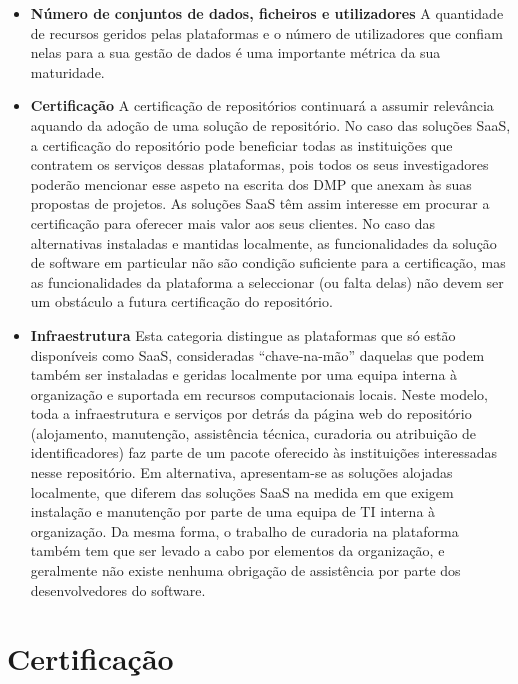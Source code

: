 \documentclass[sigconf,nonacm]{acmart}
\begin{document}
\begin{itemize}
	\item \textbf{Número de conjuntos de dados, ficheiros e utilizadores}
	A quantidade de recursos geridos pelas plataformas e o número de utilizadores que confiam nelas para a sua gestão de dados é uma importante métrica da sua maturidade. 
	\item \textbf{Certificação}
	A certificação de repositórios continuará a assumir relevância aquando da adoção de uma solução de repositório. No caso das soluções \gls{SaaS}, a certificação do repositório pode beneficiar todas as instituições que contratem os serviços dessas plataformas, pois todos os seus investigadores poderão mencionar esse aspeto na escrita dos \gls{DMP} que anexam às suas propostas de projetos. As soluções \gls{SaaS} têm assim interesse em procurar a certificação para oferecer mais valor aos seus clientes. No caso das alternativas instaladas e mantidas localmente, as funcionalidades da solução de software em particular não são condição suficiente para a certificação, mas as funcionalidades da plataforma a seleccionar (ou falta delas) não devem ser um obstáculo a futura certificação do repositório.
	\item \textbf{Infraestrutura}
	Esta categoria distingue as plataformas que só estão disponíveis como \gls{SaaS}, consideradas ``chave-na-mão'' daquelas que podem também ser instaladas e geridas localmente por uma equipa interna à organização e suportada em recursos computacionais locais. Neste modelo, toda a infraestrutura e serviços por detrás da página web do repositório (alojamento, manutenção, assistência técnica, curadoria ou atribuição de identificadores) faz parte de um pacote oferecido às instituições interessadas nesse repositório. Em alternativa, apresentam-se as soluções alojadas localmente, que diferem das soluções \gls{SaaS} na medida em que exigem instalação e manutenção por parte de uma equipa de \gls{TI} interna à organização. Da mesma forma, o trabalho de curadoria na plataforma também tem que ser levado a cabo por elementos da organização, e geralmente não existe nenhuma obrigação de assistência por parte dos desenvolvedores do software.
\end{itemize}



\section{Certificação} %
\label{sec:certificacao}
\end{document}
